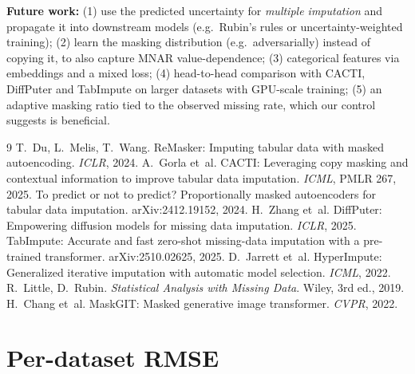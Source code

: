 \documentclass[11pt]{article}
\begin{document}
\textbf{Future work:} (1) use the predicted uncertainty for \emph{multiple imputation} and propagate it into downstream models (e.g.\ Rubin's rules or uncertainty-weighted training); (2) learn the masking distribution (e.g.\ adversarially) instead of copying it, to also capture MNAR value-dependence; (3) categorical features via embeddings and a mixed loss; (4) head-to-head comparison with CACTI, DiffPuter and TabImpute on larger datasets with GPU-scale training; (5) an adaptive masking ratio tied to the observed missing rate, which our control suggests is beneficial.

\begin{thebibliography}{9}\small
{} T.~Du, L.~Melis, T.~Wang. ReMasker: Imputing tabular data with masked autoencoding. \emph{ICLR}, 2024.
 A.~Gorla et~al. CACTI: Leveraging copy masking and contextual information to improve tabular data imputation. \emph{ICML}, PMLR 267, 2025.
 To predict or not to predict? Proportionally masked autoencoders for tabular data imputation. arXiv:2412.19152, 2024.
 H.~Zhang et~al. DiffPuter: Empowering diffusion models for missing data imputation. \emph{ICLR}, 2025.
 TabImpute: Accurate and fast zero-shot missing-data imputation with a pre-trained transformer. arXiv:2510.02625, 2025.
 D.~Jarrett et~al. HyperImpute: Generalized iterative imputation with automatic model selection. \emph{ICML}, 2022.
 R.~Little, D.~Rubin. \emph{Statistical Analysis with Missing Data}. Wiley, 3rd ed., 2019.
 H.~Chang et~al. MaskGIT: Masked generative image transformer. \emph{CVPR}, 2022.
\end{thebibliography}

\appendix
\section{Per-dataset RMSE}\label{app:perds}
\begin{table}[h]
\centering\setlength{\tabcolsep}{2.5pt}
\resizebox{\linewidth}{!}{}
\caption{RMSE per dataset and mechanism (MC = MCAR, MN = MNAR; mean over 3 seeds). Best in bold.}
\end{table}
\end{document}
